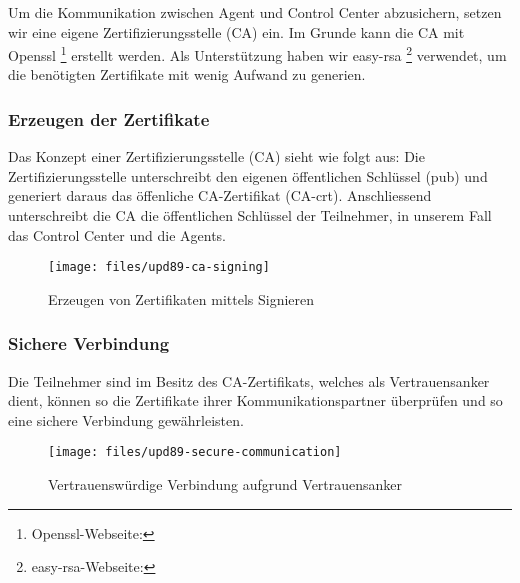 Um die Kommunikation zwischen Agent und Control Center abzusichern, setzen wir eine eigene Zertifizierungsstelle (CA) ein. Im Grunde kann die CA mit Openssl \footnote{Openssl-Webseite: } erstellt werden. Als Unterstützung haben wir easy-rsa \footnote{easy-rsa-Webseite: } verwendet, um die benötigten Zertifikate mit wenig Aufwand zu generien.


\subsubsection*{Erzeugen der Zertifikate}
Das Konzept einer Zertifizierungsstelle (CA) sieht wie folgt aus: Die Zertifizierungsstelle unterschreibt den eigenen öffentlichen Schlüssel (pub) und generiert daraus das öffenliche CA-Zertifikat (CA-crt). Anschliessend unterschreibt die CA die öffentlichen Schlüssel der Teilnehmer, in unserem Fall das Control Center und die Agents.

\begin{figure}
  \centering
    \texttt{[image: files/upd89-ca-signing]}
  \caption{Erzeugen von Zertifikaten mittels Signieren}
  \label{fig:sec-signin}
\end{figure}

\clearpage
\subsubsection*{Sichere Verbindung}

Die Teilnehmer sind im Besitz des CA-Zertifikats, welches als Vertrauensanker dient, können so die Zertifikate ihrer Kommunikationspartner überprüfen und so eine sichere Verbindung gewährleisten.


\begin{figure}
  \centering
    \texttt{[image: files/upd89-secure-communication]}
  \caption{Vertrauenswürdige Verbindung aufgrund Vertrauensanker}
  \label{fig:sec-connection}
\end{figure}
